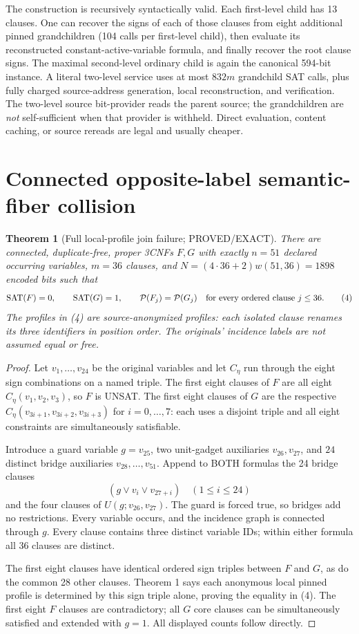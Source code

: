 \documentclass[11pt]{article}
\newtheorem{theorem}{Theorem}
\begin{document}
The construction is recursively syntactically valid. Each first-level
child has 13 clauses. One can recover the signs of each of those clauses
from eight additional pinned grandchildren (104 calls per first-level
child), then evaluate its reconstructed constant-active-variable
formula, and finally recover the root clause signs. The maximal
second-level ordinary child is again the canonical 594-bit instance.
A literal two-level service uses at most $832m$ grandchild SAT calls,
plus fully charged source-address generation, local reconstruction,
and verification. The two-level source bit-provider reads the parent
source; the grandchildren are \emph{not} self-sufficient when that
provider is withheld. Direct evaluation, content caching, or source
rereads are legal and usually cheaper.

\section{Connected opposite-label semantic-fiber collision}
\begin{theorem}[Full local-profile join failure; PROVED/EXACT]
There are connected, duplicate-free, proper 3CNFs $F,G$ with exactly
$n=51$ declared occurring variables, $m=36$ clauses, and
$N=(4\cdot36+2)w(51,36)=1898$ encoded bits such that
\[
 \operatorname{SAT}(F)=0,\qquad \operatorname{SAT}(G)=1,
 \qquad {\cal P}(F_j)={\cal P}(G_j)
 \quad\text{for every ordered clause }j\le36.
 \tag{4}
\]
The profiles in (4) are source-\emph{anonymized} profiles: each
isolated clause renames its three identifiers in position order.
The originals' incidence labels are not assumed equal or free.
\end{theorem}
\begin{proof}
Let $v_1,\ldots,v_{24}$ be the original variables and let
$C_\eta$ run through the eight sign combinations on a named
triple. The first eight clauses of $F$ are all eight
$C_\eta(v_1,v_2,v_3)$, so $F$ is UNSAT. The first eight clauses of
$G$ are the respective $C_\eta(v_{3i+1},v_{3i+2},v_{3i+3})$
for $i=0,\ldots,7$: each uses a disjoint triple and all eight
constraints are simultaneously satisfiable.

Introduce a guard variable $g=v_{25}$, two unit-gadget
auxiliaries $v_{26},v_{27}$, and $24$ distinct
bridge auxiliaries $v_{28},\ldots,v_{51}$.
Append to BOTH formulas the 24 bridge clauses
\[
 (g\vee v_i\vee v_{27+i})\quad (1\le i\le24)
\]
and the four clauses of $U(g;v_{26},v_{27})$.
The guard is forced true, so bridges add no restrictions.
Every variable occurs, and the incidence graph is connected
through $g$. Every clause contains three distinct variable IDs;
within either formula all 36 clauses are distinct.

The first eight clauses have identical ordered sign triples
between $F$ and $G$, as do the common 28 other clauses.
Theorem 1 says each anonymous local pinned profile is determined
by this sign triple alone, proving the equality in (4).
The first eight $F$ clauses are contradictory; all $G$ core
clauses can be simultaneously satisfied and extended with $g=1$.
All displayed counts follow directly.
\end{proof}
\end{document}
